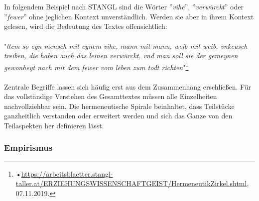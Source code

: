 \documentclass[12pt,a4paper]{article}
\begin{document}
\\
\\
In folgendem Beispiel nach STANGL sind die Wörter ''\textit{vihe}'', ''\textit{verwürckt}'' oder ''\textit{fewer}'' ohne jeglichen Kontext unverständlich. Werden sie aber in ihrem Kontext gelesen, wird die Bedeutung des Textes offensichtlich:
\\
\\
"\textit{ltem so eyn mensch mit eynem vihe, mann mit mann, weib mit weib, vnkeusch treiben, die haben auch das leinen verwürckt, vnd man soll sie der gemeynen gewonheyt nach mit dem fewer vom leben zum todt richten}"\footnote{•\protect\url{https://arbeitsblaetter.stangl-taller.at/ERZIEHUNGSWISSENSCHAFTGEIST/HermeneutikZirkel.shtml}, 07.11.2019.}
\\
\\
Zentrale Begriffe lassen sich häufig erst aus dem Zusammenhang erschließen. Für das vollständige Verstehen des Gesamttextes müssen alle Einzelheiten nachvollziehbar sein. Die hermeneutische Spirale beinhaltet, dass Teilstücke ganzheitlich verstanden oder erweitert werden und sich das Ganze von den Teilaspekten her definieren lässt.


\subsubsection{Empirismus}
\end{document}
